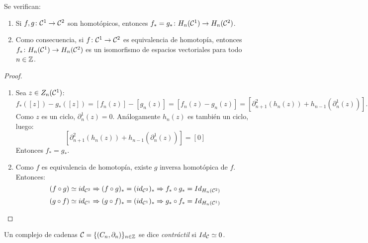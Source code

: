 \documentclass[HS.tex]{subfiles}
\begin{document}
\begin{prop}
Se verifican:
\begin{enumerate}
\item Si $f, g \colon \mathcal{C}^1 \to \mathcal{C}^2$ son homotópicos, entonces $f_* = g_* \colon H_n(\mathcal{C}^1) \to H_n(\mathcal{C}^2)$.
\item Como consecuencia, si $f \colon \mathcal{C}^1 \to \mathcal{C}^2$ es equivalencia de homotopía, entonces $f_* \colon H_n(\mathcal{C}^1) \to H_n(\mathcal{C}^2)$ es un isomorfismo de espacios vectoriales para todo $n \in \mathbb{Z}$.
\end{enumerate}
\end{prop}
\begin{proof}\
\begin{enumerate}
\item Sea $z \in Z_n(\mathcal{C}^1)$:
\[ f_*([z]) - g_*([z]) = [f_n(z)]-[g_n(z)]=[f_n(z)-g_n(z)] = [\partial_{n+1}^2(h_n(z)) + h_{n-1}(\partial_n^1(z))]. \]
Como $z$ es un ciclo, $\partial_n^1(z)=0$. Análogamente $h_n(z)$ es también un ciclo, luego:
\[ [\partial_{n+1}^2(h_n(z)) + h_{n-1}(\partial_n^1(z))] = [0] \]
Entonces $f_* = g_*$.
\item Como $f$ es equivalencia de homotopía, existe $g$ inversa homotópica de $f$. Entonces:
\[ (f \circ g) \simeq id_{\mathcal{C}^2} \Rightarrow (f \circ g)_*= (id_{\mathcal{C}^2})_* \Rightarrow f_* \circ g_* = Id_{H_n(\mathcal{C}^2)}\]
\[ (g \circ f) \simeq id_{\mathcal{C}^1} \Rightarrow (g \circ f)_*= (id_{\mathcal{C}^1})_* \Rightarrow g_* \circ f_* = Id_{H_n(\mathcal{C}^1)}\]
\end{enumerate}
\end{proof}

\begin{defi}
Un complejo de cadenas $\mathcal{C} = \{(C_n, \partial_n)\}_{n \in \mathbb{Z}}$ se dice \emph{contráctil} si $Id_{\mathcal{C}} \simeq 0$.
\end{defi}
\end{document}
